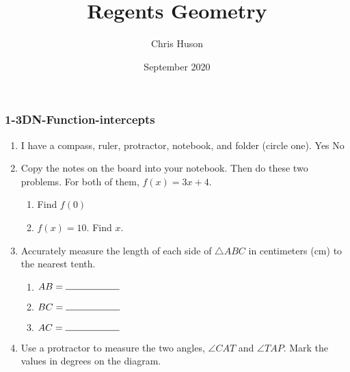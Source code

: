 \documentclass[12pt, twoside]{article}
\title{Regents Geometry}
\author{Chris Huson}
\date{September 2020}
\begin{document}
\subsubsection*{1-3DN-Function-intercepts}
\begin{enumerate}
\item I have a compass, ruler, protractor, notebook, and folder (circle one). Yes \qquad No

\item Copy the notes on the board into your notebook. Then do these two problems. For both of them, $f(x)=3x+4$.
  \begin{multicols}{2}
    \begin{enumerate}
      \item Find $f(0)$ \vspace{6cm}
      \item   $f(x)=10$. Find $x$. \vspace{6cm}
    \end{enumerate}
  \end{multicols}
    \vspace{9cm}

\item Accurately measure the length of each side of $\triangle ABC$ in centimeters (cm) to the nearest tenth.
    \bigskip
  \begin{enumerate}
    \item $AB=\rule{2cm}{0.15mm}$ \bigskip
    \item $BC=\rule{2cm}{0.15mm}$ \bigskip
    \item $AC=\rule{2cm}{0.15mm}$
  \end{enumerate}
  \begin{center}
  \end{center}

\newpage

\item Use a protractor to measure the two angles, $\angle CAT$ and $\angle TAP$. Mark the values in degrees on the diagram.
\vspace{1cm}
\begin{center}
\end{center}


\end{enumerate}
\end{document}
